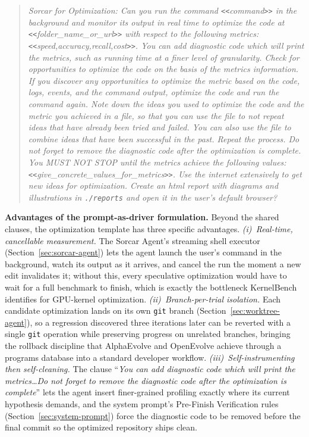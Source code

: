 \documentclass{article}
\begin{document}
\begin{quote}\small\itshape
Sorcar for Optimization: Can you run the command \texttt{<\!<}command\texttt{>\!>} in the background and monitor its output in real time to optimize the code at \texttt{<\!<}folder\_name\_or\_url\texttt{>\!>} with respect to the following metrics: \texttt{<\!<}speed,accuracy,recall,cost\texttt{>\!>}.  You can add diagnostic code which will print the metrics, such as running time at a finer level of granularity.  Check for opportunities to optimize the code on the basis of the metrics information.  If you discover any opportunities to optimize the metric based on the code, logs, events, and the command output, optimize the code and run the command again.  Note down the ideas you used to optimize the code and the metric you achieved in a file, so that you can use the file to not repeat ideas that have already been tried and failed.  You can also use the file to combine ideas that have been successful in the past.  Repeat the process.  Do not forget to remove the diagnostic code after the optimization is complete.  You MUST NOT STOP until the metrics achieve the following values: \texttt{<\!<}give\_concrete\_values\_for\_metrics\texttt{>\!>}.  Use the internet extensively to get new ideas for optimization.  Create an html report with diagrams and illustrations in \texttt{./reports} and open it in the user's default browser?
\end{quote}

\textbf{Advantages of the prompt-as-driver formulation.}  Beyond the shared clauses, the optimization template has three specific advantages.  \emph{(i)~Real-time, cancellable measurement.}  The Sorcar Agent's streaming shell executor (Section~\ref{sec:sorcar-agent}) lets the agent launch the user's command in the background, watch its output as it arrives, and cancel the run the moment a new edit invalidates it; without this, every speculative optimization would have to wait for a full benchmark to finish, which is exactly the bottleneck KernelBench~\citep{ouyang2025kernelbench} identifies for GPU-kernel optimization.  \emph{(ii)~Branch-per-trial isolation.}  Each candidate optimization lands on its own \texttt{git} branch (Section~\ref{sec:worktree-agent}), so a regression discovered three iterations later can be reverted with a single \texttt{git} operation while preserving progress on unrelated branches, bringing the rollback discipline that AlphaEvolve and OpenEvolve achieve through a programs database into a standard developer workflow.  \emph{(iii)~Self-instrumenting then self-cleaning.}  The clause ``\emph{You can add diagnostic code which will print the metrics\ldots Do not forget to remove the diagnostic code after the optimization is complete}'' lets the agent insert finer-grained profiling exactly where its current hypothesis demands, and the system prompt's Pre-Finish Verification rules (Section~\ref{sec:system-prompt}) force the diagnostic code to be removed before the final commit so the optimized repository ships clean.
\end{document}
